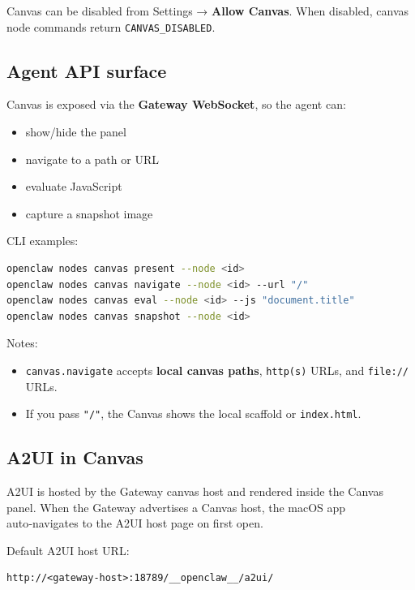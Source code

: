 Canvas can be disabled from Settings → \textbf{Allow Canvas}. When disabled, canvas
node commands return \texttt{CANVAS\_DISABLED}.

\subsection{Agent API surface}


Canvas is exposed via the \textbf{Gateway WebSocket}, so the agent can:

\begin{itemize}
  \item show/hide the panel
  \item navigate to a path or URL
  \item evaluate JavaScript
  \item capture a snapshot image
\end{itemize}


CLI examples:

\begin{lstlisting}[language=bash]
openclaw nodes canvas present --node <id>
openclaw nodes canvas navigate --node <id> --url "/"
openclaw nodes canvas eval --node <id> --js "document.title"
openclaw nodes canvas snapshot --node <id>
\end{lstlisting}


Notes:

\begin{itemize}
  \item \texttt{canvas.navigate} accepts \textbf{local canvas paths}, \texttt{http(s)} URLs, and \texttt{file://} URLs.
  \item If you pass \texttt{"/"}, the Canvas shows the local scaffold or \texttt{index.html}.
\end{itemize}


\subsection{A2UI in Canvas}


A2UI is hosted by the Gateway canvas host and rendered inside the Canvas panel.
When the Gateway advertises a Canvas host, the macOS app auto‑navigates to the
A2UI host page on first open.

Default A2UI host URL:

\begin{lstlisting}
http://<gateway-host>:18789/__openclaw__/a2ui/
\end{lstlisting}



